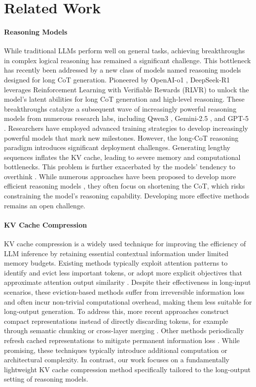 \section{Related Work}

\paragraph{Reasoning Models}
While traditional LLMs perform well on general tasks, achieving breakthroughs in complex logical reasoning has remained a significant challenge. This bottleneck has recently been addressed by a new class of models named reasoning models designed for long CoT generation.
Pioneered by OpenAI-o1 \citep{openaio1}, DeepSeek-R1 \citep{deepseekr1} leverages Reinforcement Learning with Verifiable Rewards (RLVR) to unlock the model's latent abilities for long CoT generation and high-level reasoning.
These breakthroughs catalyze a subsequent wave of increasingly powerful reasoning models from numerous research labs, including Qwen3 \citep{qwen3}, Gemini-2.5 \citep{gemini2.5}, and GPT-5 \citep{gpt5}. Researchers have employed advanced training strategies to develop increasingly powerful models that mark new milestones.
However, the long-CoT reasoning paradigm introduces significant deployment challenges. Generating lengthy sequences inflates the KV cache, leading to severe memory and computational bottlenecks. This problem is further exacerbated by the models' tendency to overthink \citep{overthinking}. While numerous approaches have been proposed to develop more efficient reasoning models \citep{overthinking1, speculativecot, jiang2025think}, they often focus on shortening the CoT, which risks constraining the model's reasoning capability. Developing more effective methods remains an open challenge.



\paragraph{KV Cache Compression}
KV cache compression is a widely used technique for improving the efficiency of LLM inference by retaining essential contextual information under limited memory budgets. Existing methods typically exploit attention patterns to identify and evict less important tokens, or adopt more explicit objectives that approximate attention output similarity \citep{ada}.
Despite their effectiveness in long-input scenarios, these eviction-based methods suffer from irreversible information loss and often incur non-trivial computational overhead, making them less suitable for long-output generation. To address this, more recent approaches construct compact representations instead of directly discarding tokens, for example through semantic chunking \citep{chunkkv} or cross-layer merging \citep{minicache}. Other methods periodically refresh cached representations to mitigate permanent information loss \citep{refreshkv}. While promising, these techniques typically introduce additional computation or architectural complexity. In contrast, our work focuses on a fundamentally lightweight KV cache compression method specifically tailored to the long-output setting of reasoning models.
